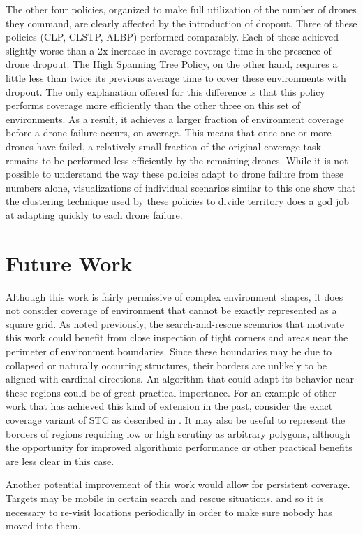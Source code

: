 The other four policies, organized to make full utilization of the number of drones they command, are clearly affected by the introduction of dropout. Three of these policies (CLP, CLSTP, ALBP) performed comparably. Each of these achieved slightly worse than a 2x increase in average coverage time in the presence of drone dropout. The High Spanning Tree Policy, on the other hand, requires a little less than twice its previous average time to cover these environments with dropout. The only explanation offered for this difference is that this policy performs coverage more efficiently than the other three on this set of environments. As a result, it achieves a larger fraction of environment coverage before a drone failure occurs, on average. This means that once one or more drones have failed, a relatively small fraction of the original coverage task remains to be performed less efficiently by the remaining drones. While it is not possible to understand the way these policies adapt to drone failure from these numbers alone, visualizations of individual scenarios similar to this one show that the clustering technique used by these policies to divide territory does a god job at adapting quickly to each drone failure.

\section{Future Work}

Although this work is fairly permissive of complex environment shapes, it does not consider coverage of environment that cannot be exactly represented as a square grid. As noted previously, the search-and-rescue scenarios that motivate this work could benefit from close inspection of tight corners and areas near the perimeter of environment boundaries. Since these boundaries may be due to collapsed or naturally occurring structures, their borders are unlikely to be aligned with cardinal directions. An algorithm that could adapt its behavior near these regions could be of great practical importance. For an example of other work that has achieved this kind of extension in the past, consider the exact coverage variant of STC as described in \cite{STC}. It may also be useful to represent the borders of regions requiring low or high scrutiny as arbitrary polygons, although the opportunity for improved algorithmic performance or other practical benefits are less clear in this case.

Another potential improvement of this work would allow for persistent coverage. Targets may be mobile in certain search and rescue situations, and so it is necessary to re-visit locations periodically in order to make sure nobody has moved into them. %

